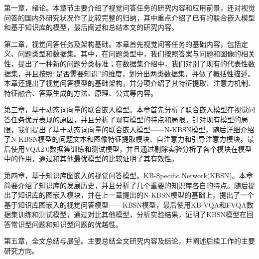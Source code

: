 第一章，绪论。本章节主要介绍了视觉问答任务的研究内容和应用前景，还对视觉问答的国内外研究状况作了比较完整的归纳，其中重点介绍了已有的联合嵌入模型和基于知识库的模型，最后阐述和总结本文的研究内容。

第二章，视觉问答任务及架构基础。本章首先视觉问答任务的基础内容，包括定义、问题类型和数据集。其中，在问题类型中，我们按照答案与问题和图像的相关性，提出了一种新的问题分类标准；在数据集介绍中，我们对别了现有的代表性数据集，并且按照“是否需要知识”的维度，划分出两类数据集，并做了概括性描述。本章还提出了视觉问答模型的基础架构，并分项介绍了其特征提取、注意力机制、特征融合、答案生成的方法、原理、公式等内容。

第三章，基于动态词向量的联合嵌入模型。本章首先分析了联合嵌入模型在视觉问答任务优异表现的原因，并且分析了现有模型的特点和局限。针对现有模型的局限，我们提出了基于动态词向量的联合嵌入模型——N-KBSN模型，随后详细介绍了N-KBSN模型的问题文本和图像特征提取模块、自注意力和引导注意力模块。最后使用VQA2.0数据集训练和测试模型，并且通过剔除实验分析了各个模块在模型中的作用，通过和其他最优模型的比较证明了其有效性。

第四章，基于知识库图嵌入的视觉问答模型。KB-Specific Network(KBSN)。本章简要介绍了知识库的发展历史，并且分析了几个重要的知识库各自的特点。随后提出了知识库的图嵌入模块，并在上一章提出的N-KBSN模型的基础上，提出了一个基于知识库图嵌入的视觉问答模型——KBSN模型，最后使用KB-VQA和FVQA数据集训练和测试模型，通过对比其他模型，分析实验结果，证明了KBSN模型在回答常识型问题和知识型问题的优越性。

第五章，全文总结与展望。主要总结全文研究内容及结论，并阐述后续工作的主要研究方向。


